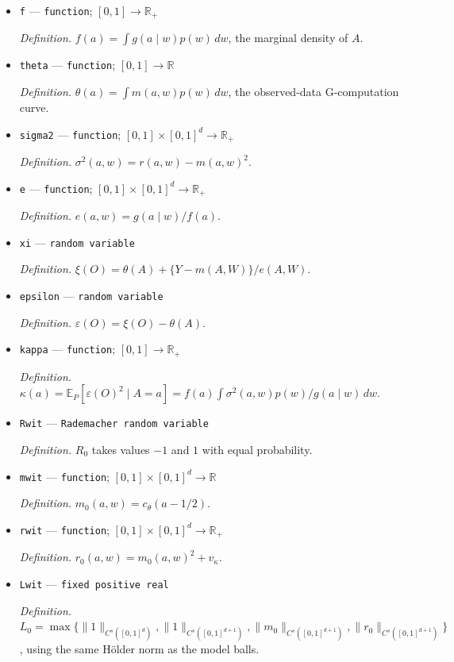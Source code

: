 \documentclass{article}
\begin{document}
\begin{itemize}
  \item \texttt{f} --- \texttt{function}; \([0,1]\to\mathbb R_{+}\)
  \par\smallskip\noindent\emph{Definition.} \(f(a)=\int g(a\mid w)p(w)\,dw\), the marginal density of \(A\).
  \item \texttt{theta} --- \texttt{function}; \([0,1]\to\mathbb R\)
  \par\smallskip\noindent\emph{Definition.} \(\theta(a)=\int m(a,w)p(w)\,dw\), the observed-data G-computation curve.
  \item \texttt{sigma2} --- \texttt{function}; \([0,1]\times[0,1]^{d}\to\mathbb R_{+}\)
  \par\smallskip\noindent\emph{Definition.} \(\sigma^{2}(a,w)=r(a,w)-m(a,w)^{2}\).
  \item \texttt{e} --- \texttt{function}; \([0,1]\times[0,1]^{d}\to\mathbb R_{+}\)
  \par\smallskip\noindent\emph{Definition.} \(e(a,w)=g(a\mid w)/f(a)\).
  \item \texttt{xi} --- \texttt{random variable}
  \par\smallskip\noindent\emph{Definition.} \(\xi(O)=\theta(A)+\{Y-m(A,W)\}/e(A,W)\).
  \item \texttt{epsilon} --- \texttt{random variable}
  \par\smallskip\noindent\emph{Definition.} \(\varepsilon(O)=\xi(O)-\theta(A)\).
  \item \texttt{kappa} --- \texttt{function}; \([0,1]\to\mathbb R_{+}\)
  \par\smallskip\noindent\emph{Definition.} \(\kappa(a)=\mathbb E_{P}[\varepsilon(O)^{2}\mid A=a]=f(a)\int\sigma^{2}(a,w)p(w)/g(a\mid w)\,dw\).
  \item \texttt{Rwit} --- \texttt{Rademacher random variable}
  \par\smallskip\noindent\emph{Definition.} \(R_0\) takes values \(-1\) and \(1\) with equal probability.
  \item \texttt{mwit} --- \texttt{function}; \([0,1]\times[0,1]^d\to\mathbb R\)
  \par\smallskip\noindent\emph{Definition.} \(m_0(a,w)=c_{\theta}(a-1/2)\).
  \item \texttt{rwit} --- \texttt{function}; \([0,1]\times[0,1]^d\to\mathbb R_+\)
  \par\smallskip\noindent\emph{Definition.} \(r_0(a,w)=m_0(a,w)^2+v_{\kappa}\).
  \item \texttt{Lwit} --- \texttt{fixed positive real}
  \par\smallskip\noindent\emph{Definition.} \(L_0=\max\{\|1\|_{C^s([0,1]^d)},\|1\|_{C^s([0,1]^{d+1})},\|m_0\|_{C^s([0,1]^{d+1})},\|r_0\|_{C^s([0,1]^{d+1})}\}\), using the same Hölder norm as the model balls.

\end{itemize}
\end{document}
